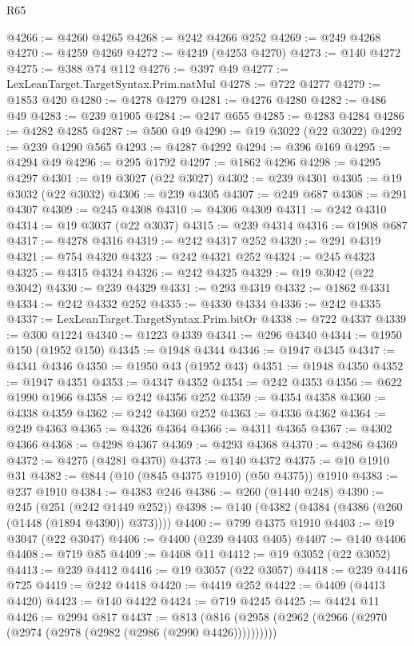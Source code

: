 \begin{lexlean}{R65}
\begin{coremodule}
{@4266 := @4260 @4265
@4268 := @242 @4266 @252
@4269 := @249 @4268
@4270 := @4259 @4269
@4272 := @4249 (@4253 @4270)
@4273 := @140 @4272
@4275 := @388 @74 @112
@4276 := @397 @49
@4277 := LexLeanTarget.TargetSyntax.Prim.natMul
@4278 := @722 @4277
@4279 := @1853 @420
@4280 := @4278 @4279
@4281 := @4276 @4280
@4282 := @486 @49
@4283 := @239 @1905
@4284 := @247 @655
@4285 := @4283 @4284
@4286 := @4282 @4285
@4287 := @500 @49
@4290 := @19 @3022 (@22 @3022)
@4292 := @239 @4290 @565
@4293 := @4287 @4292
@4294 := @396 @169
@4295 := @4294 @49
@4296 := @295 @1792
@4297 := @1862 @4296
@4298 := @4295 @4297
@4301 := @19 @3027 (@22 @3027)
@4302 := @239 @4301
@4305 := @19 @3032 (@22 @3032)
@4306 := @239 @4305
@4307 := @249 @687
@4308 := @291 @4307
@4309 := @245 @4308
@4310 := @4306 @4309
@4311 := @242 @4310
@4314 := @19 @3037 (@22 @3037)
@4315 := @239 @4314
@4316 := @1908 @687
@4317 := @4278 @4316
@4319 := @242 @4317 @252
@4320 := @291 @4319
@4321 := @754 @4320
@4323 := @242 @4321 @252
@4324 := @245 @4323
@4325 := @4315 @4324
@4326 := @242 @4325
@4329 := @19 @3042 (@22 @3042)
@4330 := @239 @4329
@4331 := @293 @4319
@4332 := @1862 @4331
@4334 := @242 @4332 @252
@4335 := @4330 @4334
@4336 := @242 @4335
@4337 := LexLeanTarget.TargetSyntax.Prim.bitOr
@4338 := @722 @4337
@4339 := @300 @1224
@4340 := @1223 @4339
@4341 := @296 @4340
@4344 := @1950 @150 (@1952 @150)
@4345 := @1948 @4344
@4346 := @1947 @4345
@4347 := @4341 @4346
@4350 := @1950 @43 (@1952 @43)
@4351 := @1948 @4350
@4352 := @1947 @4351
@4353 := @4347 @4352
@4354 := @242 @4353
@4356 := @622 @1990 @1966
@4358 := @242 @4356 @252
@4359 := @4354 @4358
@4360 := @4338 @4359
@4362 := @242 @4360 @252
@4363 := @4336 @4362
@4364 := @249 @4363
@4365 := @4326 @4364
@4366 := @4311 @4365
@4367 := @4302 @4366
@4368 := @4298 @4367
@4369 := @4293 @4368
@4370 := @4286 @4369
@4372 := @4275 (@4281 @4370)
@4373 := @140 @4372
@4375 := @10 @1910 @31
@4382 := @844 (@10 (@845 @4375 @1910) (@50 @4375)) @1910
@4383 := @237 @1910
@4384 := @4383 @246
@4386 := @260 (@1440 @248)
@4390 := @245 (@251 (@242 @1449 @252))
@4398 := @140 (@4382 (@4384 (@4386 (@260 (@1448 (@1894 @4390)) @373))))
@4400 := @799 @4375 @1910
@4403 := @19 @3047 (@22 @3047)
@4406 := @4400 (@239 @4403 @405)
@4407 := @140 @4406
@4408 := @719 @85
@4409 := @4408 @11
@4412 := @19 @3052 (@22 @3052)
@4413 := @239 @4412
@4416 := @19 @3057 (@22 @3057)
@4418 := @239 @4416 @725
@4419 := @242 @4418
@4420 := @4419 @252
@4422 := @4409 (@4413 @4420)
@4423 := @140 @4422
@4424 := @719 @4245
@4425 := @4424 @11
@4426 := @2994 @817
@4437 := @813 (@816 (@2958 (@2962 (@2966 (@2970 (@2974 (@2978 (@2982 (@2986 (@2990 @4426))))))))))
}
\end{coremodule}
\end{lexlean}
